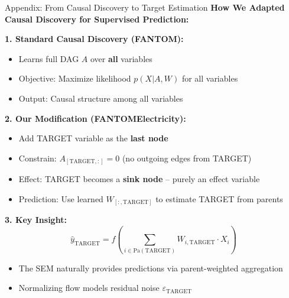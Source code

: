 \documentclass[aspectratio=169]{beamer}
\begin{document}
\begin{frame}{Appendix: From Causal Discovery to Target Estimation}
\textbf{How We Adapted Causal Discovery for Supervised Prediction:}

\vspace{0.2cm}
\textbf{1. Standard Causal Discovery (FANTOM):}
\begin{itemize}
    \item Learns full DAG $A$ over \textbf{all} variables
    \item Objective: Maximize likelihood $p(X | A, W)$ for all variables
    \item Output: Causal structure among all variables
\end{itemize}

\vspace{0.2cm}
\textbf{2. Our Modification (FANTOMElectricity):}
\begin{itemize}
    \item Add TARGET variable as the \textbf{last node}
    \item Constrain: $A_{[\text{TARGET}, :]} = 0$ (no outgoing edges from TARGET)
    \item Effect: TARGET becomes a \textbf{sink node} -- purely an effect variable
    \item Prediction: Use learned $W_{[:, \text{TARGET}]}$ to estimate TARGET from parents
\end{itemize}

\vspace{0.2cm}
\textbf{3. Key Insight:}
\begin{equation*}
\hat{y}_{\text{TARGET}} = f\left(\sum_{i \in \text{Pa}(\text{TARGET})} W_{i,\text{TARGET}} \cdot X_i\right)
\end{equation*}
\begin{itemize}
    \item The SEM naturally provides predictions via parent-weighted aggregation
    \item Normalizing flow models residual noise $\varepsilon_{\text{TARGET}}$
\end{itemize}
\end{frame}
\end{document}
